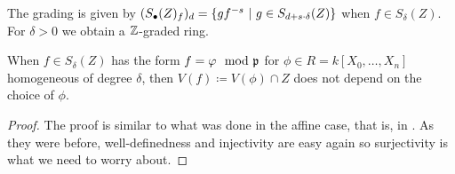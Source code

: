 \documentclass[a4paper,parskip=half,numbers=enddot, DIV=12]{scrreprt}
\begin{document}
\begin{rem*}
    \begin{alphanumerate}
        \item 
            The grading is given by $(S_\bullet(Z)_f)_d =\left\{gf^{-s}\ \middle|\  g\in S_{d+s\cdot \delta}(Z)\right\}$ when $f\in S_\delta(Z)$. For $\delta>0$ we obtain a $\mathbb{Z}$-graded ring.
        \item 
            When $f\in S_\delta(Z)$ has the form $f=\varphi \mod {\mathfrak{p}}$ for $\phi \in R = k[X_0,\ldots, X_n]$ homogeneous of degree $\delta$, then $V(f)\coloneqq V(\phi)\cap Z$ does not depend on the choice of $\phi$.
    \end{alphanumerate}
\end{rem*}
\begin{proof}
    The proof is similar to what was done in the affine case, that is, in \cite[Proposition~2.2.2]{alg1}. As they were before, well-definedness and injectivity are easy again so surjectivity is what we need to worry about. 
    

\end{proof}
\end{document}
